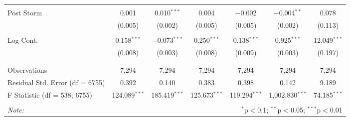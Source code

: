 \begin{table}[!htbp]
\begin{tabular}{@{\extracolsep{5pt}}lcccccc}
  & & & & & & \\ 
 Post Storm & 0.001 & 0.010$^{***}$ & 0.004 & $-$0.002 & $-$0.004$^{**}$ & 0.078 \\ 
  & (0.005) & (0.002) & (0.005) & (0.005) & (0.002) & (0.113) \\ 
  & & & & & & \\ 
 Log Cont. & 0.158$^{***}$ & $-$0.073$^{***}$ & 0.250$^{***}$ & 0.138$^{***}$ & 0.925$^{***}$ & 12.049$^{***}$ \\ 
  & (0.008) & (0.003) & (0.008) & (0.009) & (0.003) & (0.197) \\ 
  & & & & & & \\ 
\hline \\[-1.8ex] 
Observations & 7,294 & 7,294 & 7,294 & 7,294 & 7,294 & 7,294 \\ 
Residual Std. Error (df = 6755) & 0.392 & 0.140 & 0.383 & 0.398 & 0.142 & 9.189 \\ 
F Statistic (df = 538; 6755) & 124.089$^{***}$ & 185.419$^{***}$ & 125.673$^{***}$ & 119.294$^{***}$ & 1,002.830$^{***}$ & 74.185$^{***}$ \\ 
\hline 
\hline \\[-1.8ex] 
\textit{Note:}  & \multicolumn{6}{r}{$^{*}$p$<$0.1; $^{**}$p$<$0.05; $^{***}$p$<$0.01} \\ 
\end{tabular} 
\end{table} 
